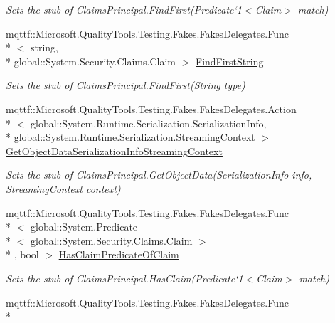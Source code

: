 \begin{DoxyCompactItemize}
\begin{DoxyCompactList}\small\item\em Sets the stub of Claims\-Principal.\-Find\-First(Predicate`1$<$Claim$>$ match)\end{DoxyCompactList}\item 
mqttf\-::\-Microsoft.\-Quality\-Tools.\-Testing.\-Fakes.\-Fakes\-Delegates.\-Func\\*
$<$ string, \\*
global\-::\-System.\-Security.\-Claims.\-Claim $>$ \hyperlink{class_system_1_1_security_1_1_principal_1_1_fakes_1_1_stub_windows_principal_a6fb9ffc64db7fa3b432c9bf13b21327b}{Find\-First\-String}
\begin{DoxyCompactList}\small\item\em Sets the stub of Claims\-Principal.\-Find\-First(\-String type)\end{DoxyCompactList}\item 
mqttf\-::\-Microsoft.\-Quality\-Tools.\-Testing.\-Fakes.\-Fakes\-Delegates.\-Action\\*
$<$ global\-::\-System.\-Runtime.\-Serialization.\-Serialization\-Info, \\*
global\-::\-System.\-Runtime.\-Serialization.\-Streaming\-Context $>$ \hyperlink{class_system_1_1_security_1_1_principal_1_1_fakes_1_1_stub_windows_principal_a41f4868fce6ab2149125e448b9966e1d}{Get\-Object\-Data\-Serialization\-Info\-Streaming\-Context}
\begin{DoxyCompactList}\small\item\em Sets the stub of Claims\-Principal.\-Get\-Object\-Data(\-Serialization\-Info info, Streaming\-Context context)\end{DoxyCompactList}\item 
mqttf\-::\-Microsoft.\-Quality\-Tools.\-Testing.\-Fakes.\-Fakes\-Delegates.\-Func\\*
$<$ global\-::\-System.\-Predicate\\*
$<$ global\-::\-System.\-Security.\-Claims.\-Claim $>$\\*
, bool $>$ \hyperlink{class_system_1_1_security_1_1_principal_1_1_fakes_1_1_stub_windows_principal_a8b7164d9262054b0d817a6213723ff84}{Has\-Claim\-Predicate\-Of\-Claim}
\begin{DoxyCompactList}\small\item\em Sets the stub of Claims\-Principal.\-Has\-Claim(Predicate`1$<$Claim$>$ match)\end{DoxyCompactList}\item 
mqttf\-::\-Microsoft.\-Quality\-Tools.\-Testing.\-Fakes.\-Fakes\-Delegates.\-Func\\*

\end{DoxyCompactItemize}
